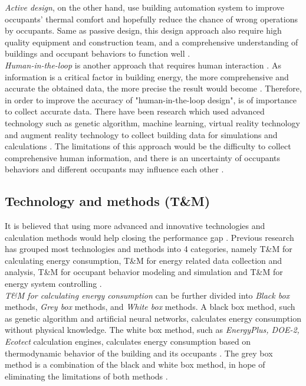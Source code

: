 			\textit{Active design}, on the other hand, use building automation system to improve occupants' thermal comfort and hopefully reduce the chance of wrong operations by occupants. Same as passive design, this design approach also require high quality equipment and construction team, and a comprehensive understanding of buildings and occupant behaviors to function well \cite{DEWILDE201440}.\\

			\textit{Human-in-the-loop} is another approach that requires human interaction \cite{karwowski2001international}. As information is a critical factor in building energy, the more comprehensive and accurate the obtained data, the more precise the result would become \cite{NIU2016275}. Therefore, in order to improve the accuracy of "human-in-the-loop design", is of importance to collect accurate data. There have been research which used advanced technology such as genetic algorithm, machine learning, virtual reality technology and augment reality technology to collect building data for simulations and calculations \cite{karwowski2001international}. The limitations of this approach would be the difficulty to collect comprehensive human information, and there is an uncertainty of occupants behaviors and different occupants may influence each other \cite{masoso2010dark}.

		\subsection{Technology and methods (T\&M)}

			It is believed that using more advanced and innovative technologies and calculation methods would help closing the performance gap \cite{ZOU2018165}. Previous research has grouped most technologies and methods into 4 categories, namely T\&M for calculating energy consumption, T\&M for energy related data collection and analysis, T\&M for occupant behavior modeling and simulation and T\&M for energy system controlling \cite{ZOU2018165}.\\

			\textit{T\&M for calculating energy consumption} can be further divided into \textit{Black box} methods, \textit{Grey box} methods, and \textit{White box} methods. A black box method, such as genetic algorithm and artificial neural networks, calculates energy consumption without physical knowledge. The white box method, such as \textit{EnergyPlus, DOE-2, Ecotect} calculation engines, calculates energy consumption based on thermodynamic behavior of the building and its occupants \cite{li2014methods,xu2007optimal}. The grey box method is a combination of the black and white box method, in hope of eliminating the limitations of both methods \cite{ZOU2018165}.\\

